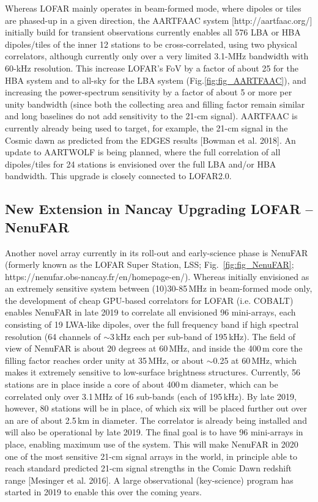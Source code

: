 Whereas LOFAR mainly operates in beam-formed mode, where dipoles or tiles are phased-up in a given direction, the AARTFAAC system [http://aartfaac.org/] initially build for transient observations currently enables all 576 LBA or HBA dipoles/tiles of the inner 12 stations to be cross-correlated, using two physical correlators, although currently only over a very limited 3.1-MHz bandwidth with 60-kHz resolution. This increase LOFAR's FoV by a factor of about 25 for the HBA system and to all-sky for the LBA system (Fig.\ref{fig:fig_AARTFAAC}), and increasing the power-spectrum sensitivity by a factor of about 5 or more per unity bandwidth (since both the collecting area and filling factor remain similar and long baselines do not add sensitivity to the 21-cm signal). AARTFAAC is currently already being used to target, for example, the 21-cm signal in the Cosmic dawn as predicted from the EDGES results [Bowman et al. 2018]. An update to AARTWOLF is being planned, where the full correlation of all dipoles/tiles for 24 stations is envisioned over the full LBA and/or HBA bandwidth. This upgrade is closely connected to LOFAR2.0.  

\subsection{New Extension in Nancay Upgrading LOFAR -- NenuFAR}

Another novel array currently in its roll-out and early-science phase is NenuFAR (formerly known as the LOFAR Super Station, LSS; Fig.~\ref{fig:fig_NenuFAR}; https://nenufar.obs-nancay.fr/en/homepage-en/). Whereas initially envisioned as an extremely sensitive system between (10)30-85\,MHz in beam-formed mode only, the development of cheap GPU-based correlators for LOFAR (i.e. COBALT) enables NenuFAR in late 2019 to correlate all envisioned 96 mini-arrays, each consisting of 19 LWA-like dipoles, over the full frequency band if high spectral resolution (64 channels of $\sim$3\,kHz each per sub-band of 195\,kHz). The field of view of NenuFAR is about 20 degrees at 60\,MHz, and inside the 400\,m core the filling factor reaches order unity at 35\,MHz, or about $\sim$0.25 at 60\,MHz, which makes it extremely sensitive to low-surface brightness structures. Currently, 56 stations are in place inside a core of about 400\,m diameter, which can be correlated only over 3.1\,MHz of 16 sub-bands (each of 195\,kHz). By late 2019, however, 80 stations will be in place, of which six will be placed further out over an are of about 2.5\,km in diameter. The correlator is already being installed and will also be operational by late 2019. The final goal is to have 96 mini-arrays in place, enabling maximum use of the system. This will make NenuFAR in 2020 one of the most sensitive 21-cm signal arrays in the world, in principle able to reach standard predicted 21-cm signal strengths in the Comic Dawn redshift range [Mesinger et al. 2016]. A large observational (key-science) program has started in 2019 to enable this over the coming years.     

